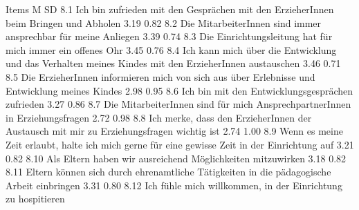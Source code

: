 \documentclass[12pt,a4paper]{article}
\begin{document}
Items
  M
           SD
8.1 Ich bin zufrieden mit den Gesprächen mit den ErzieherInnen
      beim Bringen und Abholen                                                                                                                                                                                                             
 3.19  
           0.82         
8.2 Die MitarbeiterInnen sind immer ansprechbar für meine   
      Anliegen                                                                                                                                                
 3.39
           0.74
8.3 Die Einrichtungsleitung hat für mich immer ein offenes Ohr              
 3.45
           0.76
8.4 Ich kann mich über die Entwicklung und das Verhalten
      meines Kindes mit den ErzieherInnen austauschen                                                                                             
 3.46
           0.71
8.5 Die ErzieherInnen informieren mich von sich aus über
      Erlebnisse und Entwicklung meines Kindes                                                                                                                                         
 2.98
           0.95
8.6 Ich bin mit den Entwicklungsgesprächen zufrieden                                          
 3.27
          0.86
8.7 Die MitarbeiterInnen sind für mich AnsprechpartnerInnen in             
      Erziehungsfragen                                                                                   
 2.72
          0.98
8.8 Ich merke, dass den ErzieherInnen der Austausch mit mir zu
      Erziehungsfragen wichtig ist                                                                 
 2.74
          1.00
8.9 Wenn es meine Zeit erlaubt, halte ich mich gerne für eine
      gewisse Zeit in der Einrichtung auf                                                                                                                  
 3.21
          0.82
8.10 Als Eltern haben wir ausreichend Möglichkeiten mitzuwirken                                                                                                                                                                                                                                                     
 3.18
          0.82
8.11 Eltern können sich durch ehrenamtliche Tätigkeiten in die
        pädagogische Arbeit einbringen                                                                                                                                                                                            
 3.31
          0.80  
8.12 Ich fühle mich willkommen, in der Einrichtung zu hospitieren         
\end{document}
